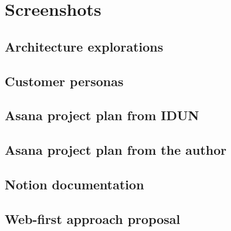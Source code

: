 \chapter{Screenshots}
\label{appendix4-screenshots}

\section*{Architecture explorations}

\section*{Customer personas}

\section*{Asana project plan from IDUN}

\section*{Asana project plan from the author}

\section*{Notion documentation}

\section*{Web-first approach proposal}